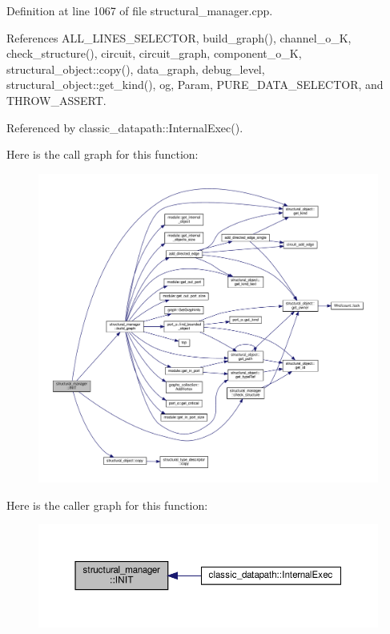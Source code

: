 Definition at line 1067 of file structural\+\_\+manager.\+cpp.



References A\+L\+L\+\_\+\+L\+I\+N\+E\+S\+\_\+\+S\+E\+L\+E\+C\+T\+OR, build\+\_\+graph(), channel\+\_\+o\+\_\+K, check\+\_\+structure(), circuit, circuit\+\_\+graph, component\+\_\+o\+\_\+K, structural\+\_\+object\+::copy(), data\+\_\+graph, debug\+\_\+level, structural\+\_\+object\+::get\+\_\+kind(), og, Param, P\+U\+R\+E\+\_\+\+D\+A\+T\+A\+\_\+\+S\+E\+L\+E\+C\+T\+OR, and T\+H\+R\+O\+W\+\_\+\+A\+S\+S\+E\+RT.



Referenced by classic\+\_\+datapath\+::\+Internal\+Exec().

Here is the call graph for this function\+:
\nopagebreak
\begin{figure}[H]
\begin{center}
\leavevmode
\includegraphics[width=350pt]{d7/d6b/classstructural__manager_ae15c3bc3a4c48d8358799bd781de36eb_cgraph}
\end{center}
\end{figure}
Here is the caller graph for this function\+:
\nopagebreak
\begin{figure}[H]
\begin{center}
\leavevmode
\includegraphics[width=350pt]{d7/d6b/classstructural__manager_ae15c3bc3a4c48d8358799bd781de36eb_icgraph}
\end{center}
\end{figure}
\mbox{\label{classstructural__manager_a4c435578fb3db26a42e2d834443fb2ea}} 
